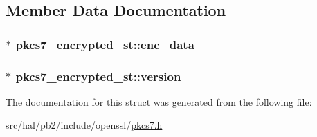 \subsection{Member Data Documentation}
\subsubsection[{\texorpdfstring{enc\+\_\+data}{enc_data}}]{$\ast$ pkcs7\+\_\+encrypted\+\_\+st\+::enc\+\_\+data}\hypertarget{structpkcs7__encrypted__st_ae9cf2da80ef23d3b5ae157898ff071a4}{}\label{structpkcs7__encrypted__st_ae9cf2da80ef23d3b5ae157898ff071a4}
\subsubsection[{\texorpdfstring{version}{version}}]{$\ast$ pkcs7\+\_\+encrypted\+\_\+st\+::version}\hypertarget{structpkcs7__encrypted__st_a5c44f8bfad75a8a28e7690ca983f50ae}{}\label{structpkcs7__encrypted__st_a5c44f8bfad75a8a28e7690ca983f50ae}


The documentation for this struct was generated from the following file\+:\begin{DoxyCompactItemize}
\item 
src/hal/pb2/include/openssl/\hyperlink{pkcs7_8h}{pkcs7.\+h}\end{DoxyCompactItemize}
